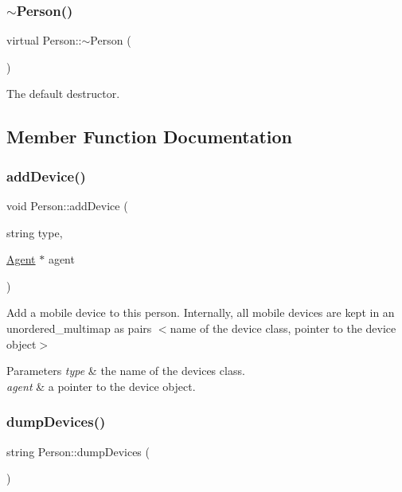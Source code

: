 \subsubsection{\texorpdfstring{$\sim$Person()}{~Person()}}
{\footnotesize\ttfamily virtual Person\+::$\sim$\+Person (\begin{DoxyParamCaption}{ }\end{DoxyParamCaption})\hspace{0.3cm}{\ttfamily [virtual]}}

The default destructor. 

\subsection{Member Function Documentation}
\mbox{\label{class_person_a3ce0a72a98c2e723e48dcd7b4d9af599}} 
\subsubsection{\texorpdfstring{addDevice()}{addDevice()}}
{\footnotesize\ttfamily void Person\+::add\+Device (\begin{DoxyParamCaption}\item[{string}]{type,  }\item[{\mbox{\hyperlink{class_agent}{Agent}} $\ast$}]{agent }\end{DoxyParamCaption})}

Add a mobile device to this person. Internally, all mobile devices are kept in an unordered\+\_\+multimap as pairs $<$name of the device class, pointer to the device object$>$ 
\begin{DoxyParams}{Parameters}
{\em type} & the name of the device\textquotesingle{}s class. \\
\hline
{\em agent} & a pointer to the device object. \\
\hline
\end{DoxyParams}
\mbox{\label{class_person_a0bc06f77b3e8a151f8c5cc77459895c9}} 
\subsubsection{\texorpdfstring{dumpDevices()}{dumpDevices()}}
{\footnotesize\ttfamily string Person\+::dump\+Devices (\begin{DoxyParamCaption}{ }\end{DoxyParamCaption})}

